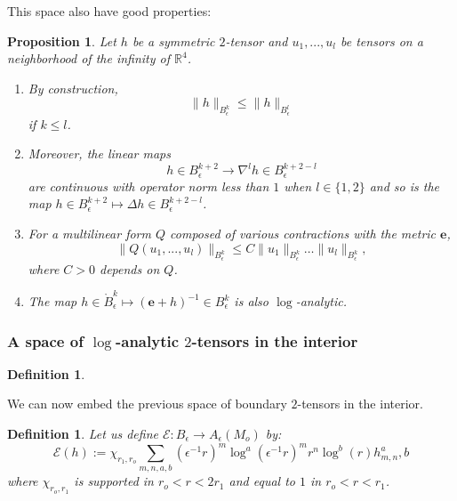 \documentclass[12pt]{article}
\newtheorem{prop}[thm]{Proposition}
\newtheorem{defn}[thm]{Definition}
\begin{document}
    This space also have good properties:
    \begin{prop}\label{properties B epsilon k}
    Let $h$ be a symmetric $2$-tensor and $u_1,...,u_l$ be tensors on a neighborhood of the infinity of $\mathbb{R}^4$. 
    \begin{enumerate}
        \item By construction,
    $$\|h\|_{B_\epsilon^k}\leqslant \|h\|_{B_\epsilon^l}$$
    if $k\leqslant l$. 
    \item Moreover, the linear maps
    $$ h\in B^{k+2}_\epsilon\to \nabla^lh\in B^{k+2-l}_\epsilon $$
    are continuous with operator norm less than $1$ when $l\in \{1,2\}$ and so is the map $ h\in B^{k+2}_\epsilon\mapsto \Delta h \in B^{k+2-l}_\epsilon$. 
    \item For a multilinear form $Q$ composed of various contractions with the metric $\mathbf{e}$,
    $$ \|Q(u_1,...,u_l)\|_{B^{k}_\epsilon} \leqslant C\|u_1\|_{B^{k}_\epsilon}\ldots \|u_l\|_{B^{k}_\epsilon},$$ where $C>0$ depends on $Q$.
    \item The map $h\in \mathring{B}_\epsilon^k\mapsto(\mathbf{e}+h)^{-1}\in B_\epsilon^k$ is also $\log$-analytic. 
    \end{enumerate}
    \end{prop}
    
    \subsubsection{A space of $\log$-analytic $2$-tensors in the interior}
    
    \begin{defn}
     
    
    \end{defn}
    
    We can now embed the previous space of boundary $2$-tensors in the interior.
    
    \begin{defn}
     Let us define $\mathcal{E}: B_\epsilon\to A_\epsilon(M_o)$ by:
     $$\mathcal{E}(h):= \chi_{r_1,r_o} \sum_{m,n,a,b} (\epsilon^{-1}r)^{m}\log^a(\epsilon^{-1}r)^{m}r^n\log^b(r) h_{m,n}^a,b$$
     where $\chi_{r_o,r_1}$ is supported in $r_o<r<2r_1$ and equal to $1$ in $r_o<r<r_1$.
    \end{defn}
    
\end{document}
